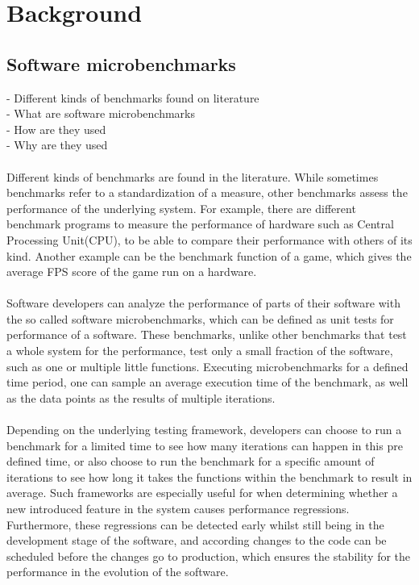 \documentclass{seal_thesis}
\begin{document}
\section{Background}

\subsection{Software microbenchmarks}
- Different kinds of benchmarks found on literature \\
- What are software microbenchmarks \\
- How are they used \\
- Why are they used \\
\\
Different kinds of benchmarks are found in the literature. While sometimes benchmarks refer to a standardization of a measure, other benchmarks assess the performance of the underlying system. For example, there are different benchmark programs to measure the performance of hardware such as Central Processing Unit(CPU), to be able to compare their performance with others of its kind. Another example can be the benchmark function of a game, which gives the average FPS score of the game run on a hardware.\\
\\
Software developers can analyze the performance of parts of their software with the so called software microbenchmarks, which can be defined as unit tests for performance of a software. These benchmarks, unlike other benchmarks that test a whole system for the performance, test only a small fraction of the software, such as one or multiple little functions. Executing microbenchmarks for a defined time period, one can sample an average execution time of the benchmark, as well as the data points as the results of multiple iterations.\\
\\
Depending on the underlying testing framework, developers can choose to run a benchmark for a limited time to see how many iterations can happen in this pre defined time, or also choose to run the benchmark for a specific amount of iterations to see how long it takes the functions within the benchmark to result in average. Such frameworks are especially useful for when determining whether a new introduced feature in the system causes performance regressions. Furthermore, these regressions can be detected early whilst still being in the development stage of the software, and according changes to the code can be scheduled before the changes go to production, which ensures the stability for the performance in the evolution of the software.
\end{document}
